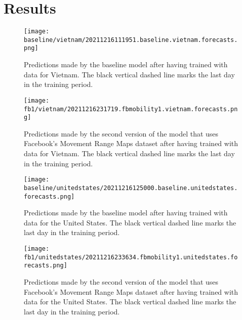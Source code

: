 \chapter{Results}
\label{chap:results}






\begin{figure}[!htb]
    \centering
    \texttt{[image: baseline/vietnam/20211216111951.baseline.vietnam.forecasts.png]}
    \caption{Predictions made by the baseline model after having trained with data for Vietnam. The black vertical dashed line marks the last day in the training period.}
    \label{fig:predictions-vietnam-baseline}
\end{figure}

\begin{figure}[!htb]
    \centering
    \texttt{[image: fb1/vietnam/20211216231719.fbmobility1.vietnam.forecasts.png]}
    \caption{Predictions made by the second version of the model that uses Facebook's Movement Range Maps dataset after having trained with data for Vietnam. The black vertical dashed line marks the last day in the training period.}
    \label{fig:predictions-vietnam-fb1}
\end{figure}


\begin{figure}[!htb]
    \centering
    \texttt{[image: baseline/unitedstates/20211216125000.baseline.unitedstates.forecasts.png]}
    \caption{Predictions made by the baseline model after having trained with data for the United States. The black vertical dashed line marks the last day in the training period.}
    \label{fig:predictions-usa-baseline}
\end{figure}

\begin{figure}[!htb]
    \centering
    \texttt{[image: fb1/unitedstates/20211216233634.fbmobility1.unitedstates.forecasts.png]}
    \caption{Predictions made by the second version of the model that uses Facebook's Movement Range Maps dataset after having trained with data for the United States. The black vertical dashed line marks the last day in the training period.}
    \label{fig:predictions-usa-fb1}
\end{figure}


